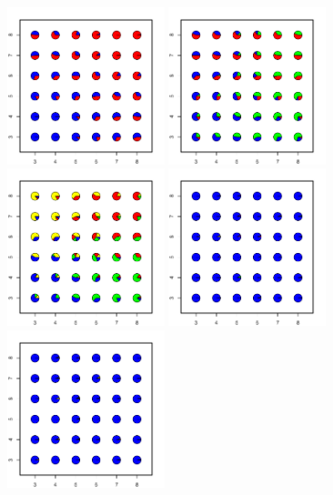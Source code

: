 \documentclass[12pt]{article}
\begin{document}
\begin{figure}
	\centering
			{\includegraphics[width=1.8in,height=1.8in]{figs/sims/simK1_nsp_pies_K2.pdf}}
			{\includegraphics[width=1.8in,height=1.8in]{figs/sims/simK1_nsp_pies_K3.pdf}}
			{\includegraphics[width=1.8in,height=1.8in]{figs/sims/simK1_nsp_pies_K4.pdf}}
			{\includegraphics[width=1.8in,height=1.8in]{figs/sims/simK1_sp_pies_K5.pdf}}
			{\includegraphics[width=1.8in,height=1.8in]{figs/sims/simK1_sp_pies_K6.pdf}}

\end{figure}
\end{document}
